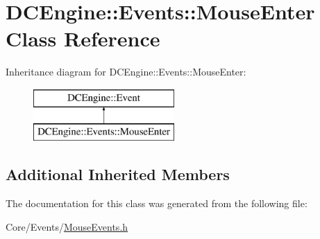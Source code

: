 \hypertarget{classDCEngine_1_1Events_1_1MouseEnter}{\section{D\-C\-Engine\-:\-:Events\-:\-:Mouse\-Enter Class Reference}
\label{classDCEngine_1_1Events_1_1MouseEnter}
}
Inheritance diagram for D\-C\-Engine\-:\-:Events\-:\-:Mouse\-Enter\-:\begin{figure}[H]
\begin{center}
\leavevmode
\includegraphics[height=2.000000cm]{classDCEngine_1_1Events_1_1MouseEnter}
\end{center}
\end{figure}
\subsection*{Additional Inherited Members}


The documentation for this class was generated from the following file\-:\begin{DoxyCompactItemize}
\item 
Core/\-Events/\hyperlink{MouseEvents_8h}{Mouse\-Events.\-h}\end{DoxyCompactItemize}
